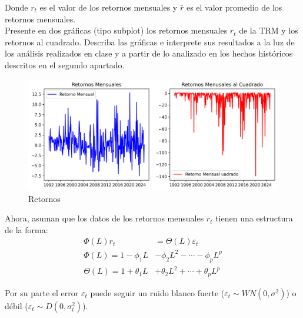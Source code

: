 \documentclass{article}
\theoremstyle{remark}
\theoremstyle{definition}
\begin{document}
\begin{enumerate}[label = \emph{\alph*})]
    {Donde $r_t$ es el valor de los retornos mensuales y $\bar{r}$ es el valor promedio de los retornos mensuales.} \\
    
    {Presente en dos gr\'aficas (tipo subplot) los retornos mensuales $r_t$ de la TRM y los retornos al cuadrado. Describa las gr\'aficas e interprete sus resultados a la luz de los an\'alisis realizados en clase y a partir de lo analizado en los hechos hist\'oricos descritos en el segundo apartado.}
        \begin{tcolorbox}[title=Soluci\'on 2.c]
            \begin{figure}[H]
                \centering
                \includegraphics[width=0.9\linewidth]{output/subplot_retornos.png}
                \caption{Retornos}
                \label{fig:retornos}
            \end{figure}
        \end{tcolorbox}
\end{enumerate}

{Ahora, asuman que los datos de los retornos mensuales $r_t$ tienen una estructura de la forma:}
\begin{align*}
    \Phi(L)r_t &= \Theta(L)\varepsilon_t \\
    \Phi(L) = 1 − \phi_1L &− \phi_2L^2 − \cdots − \phi_pL^p \\
    \Theta(L) = 1 + \theta_1L &+ \theta_2L^2 + \cdots + \theta_pL^p
\end{align*}

{Por su parte el error $\varepsilon_t$ puede seguir un ruido blanco fuerte ($\varepsilon_t\sim WN(0,
\sigma^2)$) o d\'ebil ($\varepsilon_t\sim D(0,\sigma_t^2)$).}
\end{document}
